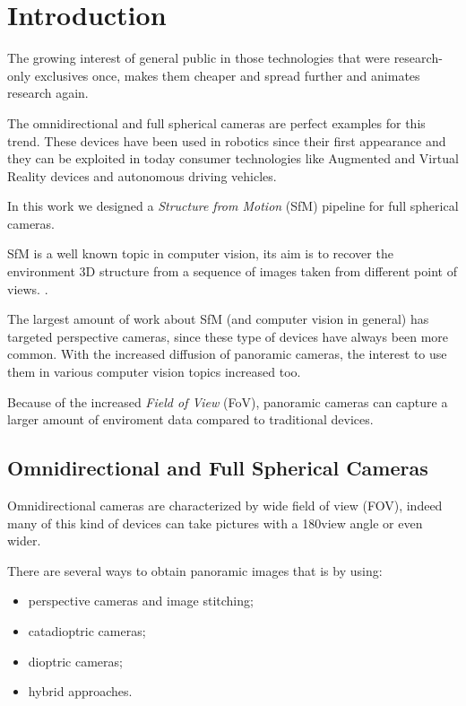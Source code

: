 \chapter{Introduction}
The growing interest of general public in those technologies that were 
research-only exclusives once, makes them cheaper and spread further and
animates research again.

The omnidirectional and full spherical cameras are perfect examples 
for this trend.
These devices have been used in robotics since their first appearance and they 
can be exploited in today consumer technologies like Augmented and Virtual 
Reality devices and autonomous driving vehicles.

In this work we designed a \textit{Structure from Motion} (SfM) pipeline for 
full spherical cameras.

SfM is a well known topic in computer vision, its aim is to recover the 
environment 3D structure from a sequence of images taken from different point 
of views. .

The largest amount of work about SfM (and computer vision in general) 
has targeted  perspective cameras, since these type of devices 
have always been more common.
With the increased diffusion of panoramic cameras, the interest to use them in 
various computer vision topics increased too.

Because of the increased \textit{Field of View} (FoV), panoramic cameras can 
capture a larger amount of enviroment data compared to traditional devices.


\section{Omnidirectional and Full Spherical Cameras}
\label{sec:cameraclassification}
Omnidirectional cameras are characterized by wide field of view (FOV), 
indeed many of this kind
of devices can take pictures with a 180\degree view angle or even wider.

There are several ways to obtain panoramic images that is by using:
\begin{itemize}
	\item perspective cameras and image stitching;
	\item catadioptric cameras;
	\item dioptric cameras;
	\item hybrid approaches.
\end{itemize}

